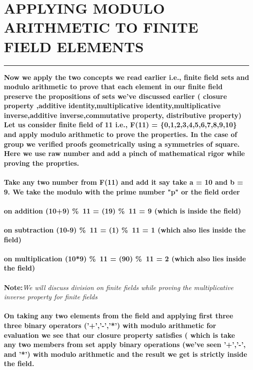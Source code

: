 \documentclass{article}
\begin{document}
\section * {APPLYING MODULO ARITHMETIC TO FINITE FIELD ELEMENTS}
\hrule
\bigskip 
\textbf{Now we apply the two concepts we read earlier i.e., finite field sets and modulo arithmetic to prove that each element in our finite field preserve the  propositions  of sets we've discussed earlier ( closure property ,additive identity,multiplicative identity,multiplicative inverse,additive inverse,commutative property, distributive property)
}
\\
\textbf{Let us consider finite field of 11 i.e., F(11) = \{0,1,2,3,4,5,6,7,8,9,10\} and apply modulo arithmetic to prove the properties. In the case of group we verified proofs geometrically using a symmetries of square. Here we use raw number and add a pinch of mathematical rigor while proving the proprties.
\\ 
\\
Take any two number from F(11) and add it say take a = 10 and b = 9. We take the modulo with the prime number "p" or the field order 
\\
\\
on addition (10+9) \%\ 11 = (19) \%\ 11 = 9 (which is inside the field)
\\
\\
on subtraction (10-9) \%\ 11 = (1) \%\ 11 = 1  (which also lies inside the field)
\\
\\
on multiplication (10*9) \%\ 11 = (90) \%\ 11 = 2 (which also lies inside the field)}
\\
\\
\textbf{Note:}\textit{We will discuss division on finite fields  while proving the multiplicative inverse property for finite fields} 
\\
\\
\textbf{On taking any two elements from the field and applying first three three binary operators ('+','-','*') with modulo arithmetic for evaluation we see that our closure property satisfies ( which is take any two members from set apply binary operations (we've seen '+','-', and '*') with modulo arithmetic  and the result we get is strictly inside the field.}

\pagebreak 
\end{document}
